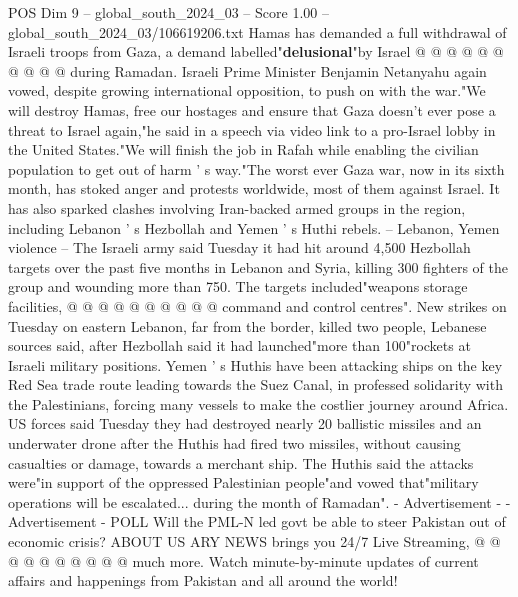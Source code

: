 \begin{textsample}{POS Dim 9 – global\_south\_2024\_03 – Score 1.00 – global\_south\_2024\_03/106619206.txt}
Hamas has demanded a full withdrawal of Israeli troops from Gaza, a demand labelled"\textbf{delusional}"by Israel @ @ @ @ @ @ @ @ @ @ during Ramadan.
Israeli Prime Minister Benjamin Netanyahu again vowed, despite growing international opposition, to push on with the war."We will destroy Hamas, free our hostages and ensure that Gaza doesn't ever pose a threat to Israel again,"he said in a speech via video link to a pro-Israel lobby in the United States."We will finish the job in Rafah while enabling the civilian population to get out of harm ' s way."The worst ever Gaza war, now in its sixth month, has stoked anger and protests worldwide, most of them against Israel.
It has also sparked clashes involving Iran-backed armed groups in the region, including Lebanon ' s Hezbollah and Yemen ' s Huthi rebels. -- Lebanon, Yemen violence -- The Israeli army said Tuesday it had hit around 4,500 Hezbollah targets over the past five months in Lebanon and Syria, killing 300 fighters of the group and wounding more than 750.
The targets included"weapons storage facilities, @ @ @ @ @ @ @ @ @ @ command and control centres".
New strikes on Tuesday on eastern Lebanon, far from the border, killed two people, Lebanese sources said, after Hezbollah said it had launched"more than 100"rockets at Israeli military positions.
Yemen ' s Huthis have been attacking ships on the key Red Sea trade route leading towards the Suez Canal, in professed solidarity with the Palestinians, forcing many vessels to make the costlier journey around Africa.
US forces said Tuesday they had destroyed nearly 20 ballistic missiles and an underwater drone after the Huthis had fired two missiles, without causing casualties or damage, towards a merchant ship.
The Huthis said the attacks were"in support of the oppressed Palestinian people"and vowed that"military operations will be escalated... during the month of Ramadan". - Advertisement - - Advertisement - POLL Will the PML-N led govt be able to steer Pakistan out of economic crisis?
ABOUT US ARY NEWS brings you 24/7 Live Streaming, @ @ @ @ @ @ @ @ @ @ much more.
Watch minute-by-minute updates of current affairs and happenings from Pakistan and all around the world!

\end{textsample}

